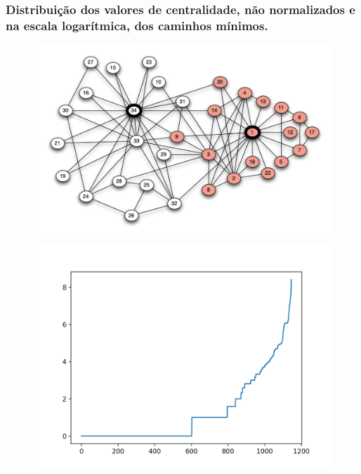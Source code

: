 \documentclass{beamer}
\begin{document}
        \begin{frame}
            \frametitle{Distribuição dos valores de centralidade, não normalizados e na escala logarítmica, dos caminhos mínimos.}
            \begin{minipage}{\textwidth}
                \begin{minipage}[b]{0.49\textwidth}
                    \begin{figure}
                        \centering
                        \includegraphics[scale=0.2]{karate-club-network.png}
                    \end{figure}
                \end{minipage}
                \hfill
                \begin{minipage}[b]{0.49\textwidth}
                    \begin{figure}
                        \centering
                        \includegraphics[scale=0.3]{short_path_centrality_ex2_log.png}
                    \end{figure}
                \end{minipage}
            \end{minipage}
        \end{frame}
\end{document}
